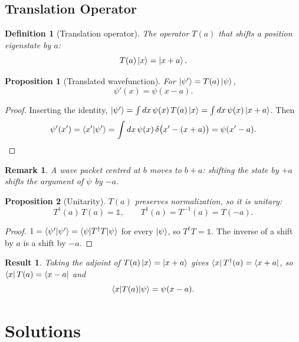 \documentclass{article}
\newtheorem{definition}{Definition}
\newtheorem{remark}{Remark}
\newtheorem{proposition}{Proposition}
\newtheorem{result}{Result}
\newcommand{\id}{\mathds{1}}
\begin{document}
\subsection{Translation Operator}
\begin{definition}[Translation operator]
    The operator $T(a)$ that shifts a position eigenstate by $a$:
    \begin{equation}
        T(a)\ket{x} = \ket{x + a}.
    \end{equation}
\end{definition}
\begin{proposition}[Translated wavefunction]
    For $\ket{\psi'} = T(a)\ket{\psi}$,
    \begin{equation}
        \psi'(x) = \psi(x - a).
    \end{equation}
\end{proposition}
\begin{proof}
    Inserting the identity, $\ket{\psi'} = \int dx\,\psi(x)\,T(a)\ket{x} = \int dx\,\psi(x)\ket{x + a}$. Then
    \[\psi'(x') = \braket{x'|\psi'} = \int dx\,\psi(x)\,\delta\big(x' - (x + a)\big) = \psi(x' - a).\]
\end{proof}
\begin{remark}
    A wave packet centred at $b$ moves to $b + a$: shifting the state by $+a$ shifts the argument of $\psi$ by $-a$.
\end{remark}
\begin{proposition}[Unitarity]
    $T(a)$ preserves normalization, so it is unitary:
    \begin{equation}
        T^\dagger(a)\,T(a) = \id, \qquad T^\dagger(a) = T^{-1}(a) = T(-a).
    \end{equation}
\end{proposition}
\begin{proof}
    $1 = \braket{\psi'|\psi'} = \braket{\psi|T^\dagger T|\psi}$ for every $\ket{\psi}$, so $T^\dagger T = \id$. The inverse of a shift by $a$ is a shift by $-a$.
\end{proof}
\begin{result}
    Taking the adjoint of $T(a)\ket{x} = \ket{x + a}$ gives $\bra{x}T^\dagger(a) = \bra{x + a}$, so $\bra{x}T(a) = \bra{x - a}$ and
    \begin{equation}
        \braket{x|T(a)|\psi} = \psi(x - a).
    \end{equation}
\end{result}


\newpage
\appendix
\section{Solutions}
\end{document}
